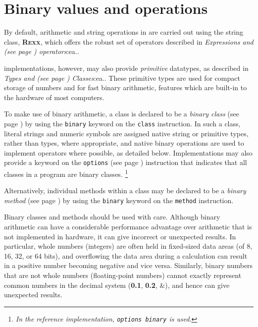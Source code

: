 \chapter{Binary values and operations}\label{refbinary}
 
By default, arithmetic and string operations in \nr{} are carried out
using the \nr{} string class, \textbf{R\textsc{exx}}, which offers the robust
set of operators described in  \emph{Expressions and (see page \pageref{refexpr}) 
operators}:ea..
 
\nr{} implementations, however, may also provide \emph{primitive}
datatypes, as described in  \emph{Types and (see page \pageref{refprims}) 
Classes}:ea..  These primitive types are used for compact storage
of numbers and for fast binary arithmetic, features which are built-in
to the hardware of most computers.
 
To make use of binary arithmetic, a class is declared to be a
 \emph{binary class} (see page \pageref{refbincla})  by using the \texttt{binary}
keyword on the \texttt{class} instruction.
In such a class, literal strings and numeric symbols are assigned native
string or primitive types, rather than \nr{} types, where appropriate,
and native binary operations are used to implement operators where
possible, as detailed below.
Implementations may also provide a keyword on the
 \texttt{options} (see page \pageref{refoptions})  instruction that indicates that
all classes in a program are binary classes.
\footnote{
\emph{In the reference implementation, \texttt{options binary} is
used}.
}
 
Alternatively, individual methods within a class may be declared to
be a  \emph{binary method} (see page \pageref{refbinme})  by using the \texttt{binary}
keyword on the \texttt{method} instruction.
 
Binary classes and methods should be used with care.  Although binary
arithmetic can have a considerable performance advantage over
arithmetic that is not implemented in hardware, it can give incorrect
or unexpected results.
In particular, whole numbers (integers) are often held in fixed-sized
data areas (of 8, 16, 32, or 64 bits), and overflowing the data area
during a calculation can result in a positive number becoming negative
and vice versa.
Similarly, binary numbers that are not whole numbers (floating-point
numbers) cannot exactly represent common numbers in the decimal system
(\textbf{0.1}, \textbf{0.2}, \&), and hence can give unexpected
results.
